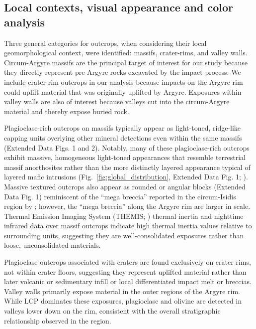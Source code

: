 \documentclass[12pt]{article}
\begin{document}
\subsection*{Local contexts, visual appearance and color analysis}

Three general categories for outcrops, when considering their local geomorphological context, were identified: massifs, crater-rims, and valley walls. Circum-Argyre massifs are the principal target of interest for our study because they directly represent pre-Argyre rocks excavated by the impact process. We include crater-rim outcrops in our analysis because impacts on the Argyre rim could uplift material that was originally uplifted by Argyre. Exposures within valley walls are also of interest because valleys cut into the circum-Argyre material and thereby expose buried rock.

Plagioclase-rich outcrops on massifs typically appear as light-toned, ridge-like capping units overlying other mineral detections even within the same massifs (Extended Data Figs. 1 and 2). Notably, many of these plagioclase-rich outcrops exhibit massive, homogeneous light-toned appearances that resemble terrestrial massif anorthosites rather than the more distinctly layered appearance typical of layered mafic intrusions (Fig.~\ref{fig:global_distribution}, Extended Data Fig. 1; \citealt{Ashwal1993}). Massive textured outcrops also appear as rounded or angular blocks (Extended Data Fig. 1) reminiscent of the ``mega breccia'' reported in the circum-Isidis region by \citet{Scheller2020}; however, the ``mega breccia'' along the Argyre rim are larger in scale. Thermal Emission Imaging System (THEMIS; \citealt{Christensen2004}) thermal inertia \citep{Fergason2006} and nighttime infrared data \citep{Edwards2011} over massif outcrops indicate high thermal inertia values relative to surrounding units, suggesting they are well-consolidated exposures rather than loose, unconsolidated materials.

Plagioclase outcrops associated with craters are found exclusively on crater rims, not within crater floors, suggesting they represent uplifted material rather than later volcanic or sedimentary infill or local differentiated impact melt or breccias. Valley walls primarily expose material in the outer regions of the Argyre rim. While LCP dominates these exposures, plagioclase and olivine are detected in valleys lower down on the rim, consistent with the overall stratigraphic relationship observed in the region.
\end{document}
